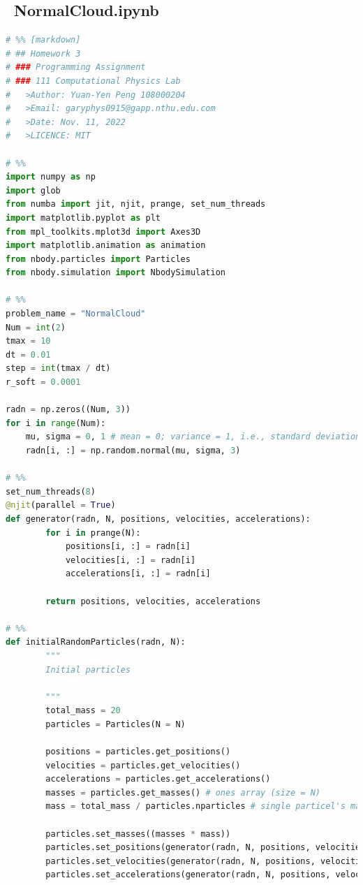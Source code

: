 \documentclass[12pt]{article}
\begin{document}
    \subsection{{\ttfamily\ NormalCloud.ipynb}}
        \begin{lstlisting}[language={Python}]
# %% [markdown]
# ## Homework 3
# ### Programming Assignment
# ### 111 Computational Physics Lab  
#   >Author: Yuan-Yen Peng 108000204  
#   >Email: garyphys0915@gapp.nthu.edu.com  
#   >Date: Nov. 11, 2022  
#   >LICENCE: MIT

# %%
import numpy as np
import glob
from numba import jit, njit, prange, set_num_threads
import matplotlib.pyplot as plt
from mpl_toolkits.mplot3d import Axes3D
import matplotlib.animation as animation
from nbody.particles import Particles
from nbody.simulation import NbodySimulation

# %%
problem_name = "NormalCloud"
Num = int(2)
tmax = 10
dt = 0.01
step = int(tmax / dt)
r_soft = 0.0001

radn = np.zeros((Num, 3))
for i in range(Num):
    mu, sigma = 0, 1 # mean = 0; variance = 1, i.e., standard deviation = sqrt(var) = 1
    radn[i, :] = np.random.normal(mu, sigma, 3)

# %%
set_num_threads(8)
@njit(parallel = True)
def generator(radn, N, positions, velocities, accelerations):
        for i in prange(N):
            positions[i, :] = radn[i]
            velocities[i, :] = radn[i]
            accelerations[i, :] = radn[i]
            
        return positions, velocities, accelerations

# %%
def initialRandomParticles(radn, N):
        """
        Initial particles

        """
        total_mass = 20
        particles = Particles(N = N)
        
        positions = particles.get_positions()
        velocities = particles.get_velocities()
        accelerations = particles.get_accelerations()
        masses = particles.get_masses() # ones array (size = N)
        mass = total_mass / particles.nparticles # single particel's mass
        
        particles.set_masses((masses * mass))
        particles.set_positions(generator(radn, N, positions, velocities, accelerations)[0])
        particles.set_velocities(generator(radn, N, positions, velocities, accelerations)[1])
        particles.set_accelerations(generator(radn, N, positions, velocities, accelerations)[2])


\end{lstlisting}
\end{document}
